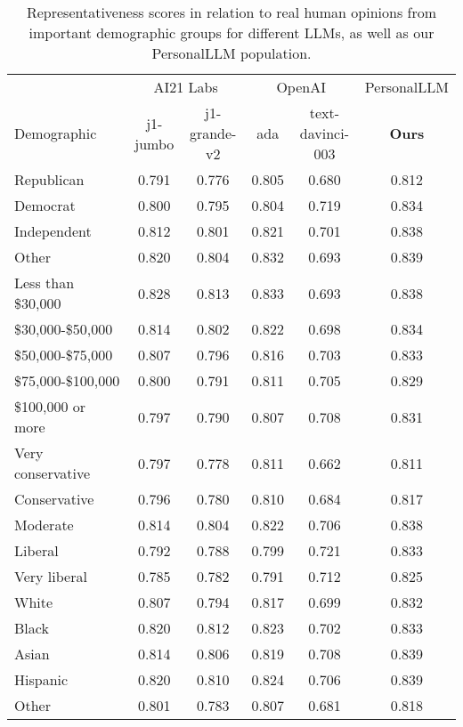 \begin{table}[!ht]
    \centering
    \begin{tabular}{lccccc}
    \toprule
     & \multicolumn{2}{c}{AI21 Labs} & \multicolumn{2}{c}{OpenAI} & \textsf{PersonalLLM} \\
    Demographic & j1-jumbo & j1-grande-v2 & ada & text-davinci-003 & \textbf{Ours} \\
    \midrule
    Republican & 0.791 & 0.776 & 0.805 & 0.680 & 0.812 \\
    Democrat & 0.800 & 0.795 & 0.804 & 0.719 & 0.834 \\
    Independent & 0.812 & 0.801 & 0.821 & 0.701 & 0.838 \\
    Other & 0.820 & 0.804 & 0.832 & 0.693 & 0.839 \\
    Less than \$30,000 & 0.828 & 0.813 & 0.833 & 0.693 & 0.838 \\
    \$30,000-\$50,000 & 0.814 & 0.802 & 0.822 & 0.698 & 0.834 \\
    \$50,000-\$75,000 & 0.807 & 0.796 & 0.816 & 0.703 & 0.833 \\
    \$75,000-\$100,000 & 0.800 & 0.791 & 0.811 & 0.705 & 0.829 \\
    \$100,000 or more & 0.797 & 0.790 & 0.807 & 0.708 & 0.831 \\
Very conservative & 0.797 & 0.778 & 0.811 & 0.662 & 0.811 \\
Conservative & 0.796 & 0.780 & 0.810 & 0.684 & 0.817 \\
Moderate & 0.814 & 0.804 & 0.822 & 0.706 & 0.838 \\
Liberal & 0.792 & 0.788 & 0.799 & 0.721 & 0.833 \\
Very liberal & 0.785 & 0.782 & 0.791 & 0.712 & 0.825 \\
White & 0.807 & 0.794 & 0.817 & 0.699 & 0.832 \\
Black & 0.820 & 0.812 & 0.823 & 0.702 & 0.833 \\
Asian & 0.814 & 0.806 & 0.819 & 0.708 & 0.839 \\
Hispanic & 0.820 & 0.810 & 0.824 & 0.706 & 0.839 \\
Other & 0.801 & 0.783 & 0.807 & 0.681 & 0.818 \\
    \bottomrule
    \end{tabular}
    \caption{Representativeness scores in relation to real human opinions from important demographic groups for different LLMs, as well as our \textsf{PersonalLLM} population.}
    \label{tab:opinion_qa_full_2}
\end{table}

